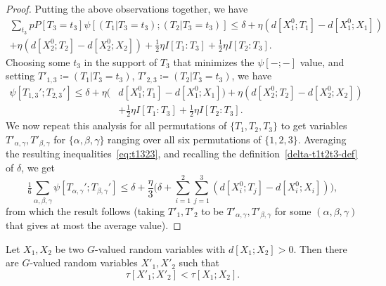 \begin{proof}
  Putting the above observations together, we have
  \begin{align*}
   \sum_{t_3}p P[T_3=t_3] \psi[(T_1 | T_3=t_3); (T_2 | T_3=t_3)] \leq \delta + \eta (d[X^0_1;T_1]-d[X^0_1;X_1]) \\
     + \eta (d[X^0_2;T_2]-d[X^0_2;X_2]) + \tfrac12 \eta I[T_1:T_3] + \tfrac12 \eta I[T_2:T_3].
   \end{align*}
   Choosing some $t_3$ in the support of $T_3$ that minimizes the $\psi[-;-]$ value, and setting $T'_{1,3} \coloneqq (T_1 | T_3 = t_3)$, $T'_{2,3} \coloneqq (T_2 | T_3 = t_3)$, we have
  \begin{align}\nonumber
   \psi[T_{1,3}';T_{2,3}'] \leq \delta + \eta (& d[X^0_1;T_1]-d[X^0_1;X_1])
      + \eta (d[X^0_2;T_2]-d[X^0_2;X_2]) \\ & + \tfrac12 \eta I[T_1:T_3] + \tfrac12 \eta I[T_2:T_3].
     \label{eq:t1323}
  \end{align}
  We now repeat this analysis for all permutations of $\{T_1,T_2,T_3\}$ to get variables $T'_{\alpha,\gamma}, T'_{\beta,\gamma}$ for $\{\alpha,\beta,\gamma\}$ ranging over all six permutations of $\{1,2,3\}$.
  Averaging the resulting inequalities~\eqref{eq:t1323}, and recalling the definition~\eqref{delta-t1t2t3-def} of $\delta$, we get
  \[ \tfrac16 \sum_{\alpha,\beta,\gamma} \psi[T_{\alpha,\gamma}';T_{\beta,\gamma}']  \leq  \delta + \frac{\eta}{3} \biggl( \delta + \sum_{i=1}^2 \sum_{j = 1}^3 (d[X^0_i;T_j]-d[X^0_i;X_i]) \biggr),
  \]
  from which the result follows (taking $T'_1,T'_2$ to be $T'_{\alpha,\gamma},T'_{\beta,\gamma}$ for some $(\alpha,\beta,\gamma)$ that gives at most the average value).
\end{proof}




\begin{theorem}\label{de-prop}
  Let $X_1, X_2$ be two $G$-valued random variables with $d[X_1;X_2] > 0$. Then there are $G$-valued random variables $X'_1, X'_2$ such that
$$\tau[X'_1;X'_2] < \tau[X_1;X_2].
$$
\end{theorem}

